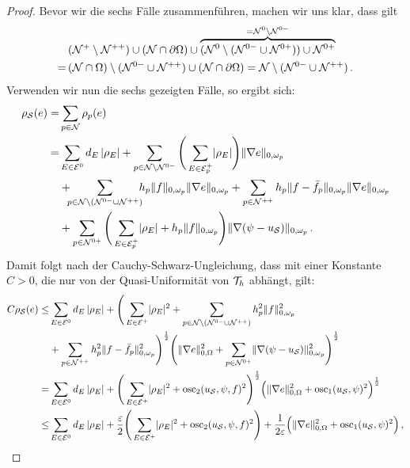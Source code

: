 \begin{itemize}
\begin{proof}
Bevor wir die sechs Fälle zusammenführen, machen wir uns klar, dass gilt
\begin{align*}
	 & (\mathcal N^+\setminus \mathcal N^{++})  \cup (\mathcal N\cap \partial \Omega)  \cup \overbrace{(\mathcal N^0 \setminus (\mathcal N^{0-} \cup \mathcal N^{0+}))  \cup\mathcal N^{0+}}^{=\mathcal N^0\setminus \mathcal N^{0-}} \\
	 = \, & (\mathcal N\cap \Omega) \setminus (\mathcal N^{0-}\cup \mathcal N^{++})\cup (\mathcal N \cap \partial \Omega) = \mathcal N \setminus (\mathcal N^{0-} \cup \mathcal N^{++}) \, .
\end{align*}
Verwenden wir nun die sechs gezeigten Fälle, so ergibt sich:
\begin{align*}
	\rho_{\mathcal S}(e) = & \sum_{p \in \mathcal N} \rho_p(e) \\
	= & \sum_{E\in \mathcal E^0} d_E\, \lvert \rho_E\rvert 
		+ \sum_{p \in \mathcal N \setminus \mathcal N^{0-}} \Bigg( \sum_{E \in \mathcal E_p^+} \lvert \rho_E\rvert \Bigg) \lVert \nabla e\rVert_{0,\omega_p} \\
	 & + \! \! \! \sum_{p \in \mathcal N\setminus(\mathcal N^{0-}\cup\mathcal N^{++})}\!\!\! h_p \lVert f\rVert_{0,\omega_p} \lVert \nabla e\rVert_{0,\omega_p} + \sum_{p \in \mathcal N^{++}} h_p \lVert f-\bar f_p\rVert_{0,\omega_p} \lVert \nabla e\rVert_{0,\omega_p} \\
	 & + \sum_{p \in \mathcal N^{0+}} \Bigg(\sum_{E\in \mathcal E^+_p} \lvert \rho_E\rvert + h_p \lVert f\rVert_{0,\omega_p}\Bigg) \lVert \nabla(\psi-u_{\mathcal S})\rVert_{0,\omega_p}  \, .
\end{align*}
Damit folgt nach der Cauchy-Schwarz-Ungleichung, dass mit einer Konstante $C>0$, die nur von der Quasi-Uniformität von $\mathcal T_h$ abhängt, gilt:
\begin{align*}
	C \rho_{\mcal S}(e) \le & \sum_{E\in \mcal E^0} d_E\, \abs{\rho_E} + \Bigg(\sum_{E\in \mcal E^+} \abs{\rho_E}^2 + \sum_{p \in \mcal N\setminus(\mcal N^{0-}\cup\mcal N^{++})} h_p^2 \norm{f}^2_{0,\omega_p}  \\
	& +  \sum_{p \in \mcal N^{++}} h_p^2 \norm{f-\bar f_p}_{0,\omega_p}^2\Bigg)^{\frac 12} \Bigg( \norm{\nabla e}^2_{0,\Omega} + \sum_{p \in \mcal N^{0+}} \norm{\nabla(\psi-u_{\mcal S})}_{0,\omega_p}^2 \Bigg)^{\frac 1 2} \\
	= &  \sum_{E\in \mcal E^0} d_E\, \abs{\rho_E} + \Bigg(\sum_{E\in \mcal E^+} \abs{\rho_E}^2 + \osc_2(u_{\mcal S},\psi,f)^2\Bigg)^{\frac 12} \Big( \norm{\nabla e}^2_{0,\Omega} + \osc_1(u_{\mcal S},\psi)^2 \Big)^{\frac 1 2} \\
	\le&\sum_{E\in \mcal E^0} d_E\, \abs{\rho_E} + \frac \eps2\Bigg(  \sum_{E\in \mcal E^+} \abs{\rho_E}^2 + \osc_2(u_{\mcal S},\psi,f)^2\Bigg) + \frac 1{2\eps} \Big( \norm{\nabla e}^2_{0,\Omega} + \osc_1(u_{\mcal S},\psi)^2 \Big) \, ,

\end{align*}
\end{proof}
\end{itemize}
